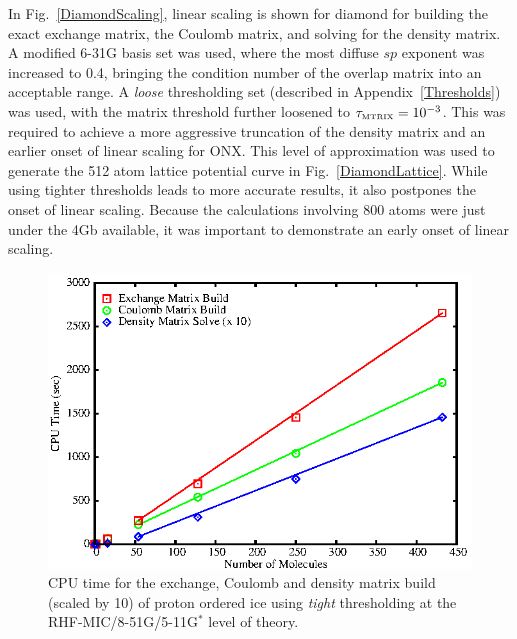 \documentclass[prb,aps,nobibnotes,twocolumn,doublespace,twocolumngrid,superbib]{revtex4}
\begin{document}
In Fig.~\ref{DiamondScaling}, linear scaling is shown for diamond for 
building the exact exchange matrix, the Coulomb matrix, and solving for the density matrix. 
A modified 6-31G basis set was used, where the most diffuse $sp$ exponent was increased to 
0.4, bringing the condition number of the overlap matrix into an acceptable range.  A 
{\it loose} thresholding set (described in Appendix~\ref{Thresholds}) was used, with 
the matrix threshold further loosened to $\Huge \tau_{\rm \scriptscriptstyle MTRIX}=10^{-3}$.  
This was required to achieve a more aggressive truncation of the density matrix and an earlier 
onset of linear scaling for {\sc ONX}.  This level of approximation was used to generate 
the 512 atom lattice potential curve in Fig.~\ref{DiamondLattice}. While using tighter thresholds 
leads to more accurate results, it also postpones the onset of linear scaling. Because the 
calculations involving 800 atoms were just under the 4Gb available, it was important to 
demonstrate an early onset of linear scaling.  


\begin{figure}[h]
\caption{CPU time for the exchange, Coulomb and density 
matrix build (scaled by 10) of proton ordered ice using {\it tight}
thresholding at the RHF-MIC/8-51G/5-11G$^*$ level of theory.}
\label{IceScaling}
{\centering \includegraphics{Timing_pIce_ONX_1.ps} \par} 
\end{figure}
\end{document}
